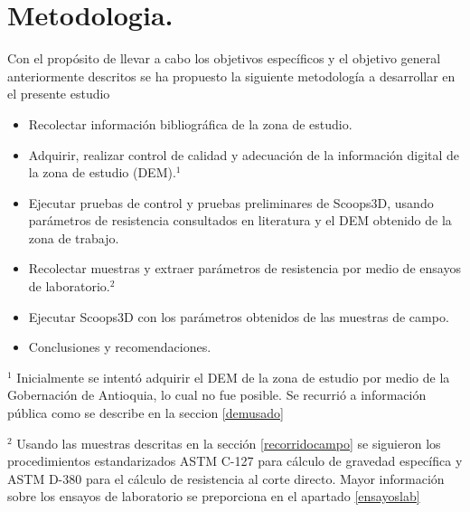 \chapter{Metodologia.}



Con el prop\'osito de llevar a cabo los objetivos espec\'ificos y el objetivo general anteriormente descritos se ha propuesto la siguiente metodolog\'ia a desarrollar en el presente estudio

\begin{itemize}


\item Recolectar informaci\'on bibliogr\'afica de la zona de estudio.
\item Adquirir, realizar control de calidad y adecuaci\'on de la informaci\'on digital de la zona de estudio (DEM).$^{1}$
\item Ejecutar pruebas de control y pruebas preliminares de Scoops3D, usando par\'ametros de resistencia consultados en literatura y el DEM obtenido de la zona de trabajo.
\item Recolectar muestras y extraer par\'ametros de resistencia por medio de ensayos de laboratorio.$^{2}$
 \item Ejecutar Scoops3D con los par\'ametros obtenidos de las muestras de campo.
 \item Conclusiones y recomendaciones.
\end{itemize}


$^{1}$ Inicialmente se intent\'o adquirir el DEM de la zona de estudio por medio de la Gobernaci\'on de Antioquia, lo cual no fue posible. Se recurri\'o a informaci\'on p\'ublica como se describe en la seccion \ref{demusado}

$^{2}$ Usando las muestras descritas en la secci\'on  \ref{recorridocampo} se siguieron los procedimientos estandarizados ASTM C-127 para c\'alculo de gravedad espec\'ifica y ASTM D-380 para el c\'alculo de resistencia al corte directo.
Mayor informaci\'on sobre los ensayos de laboratorio se preporciona en el apartado \ref{ensayoslab}



